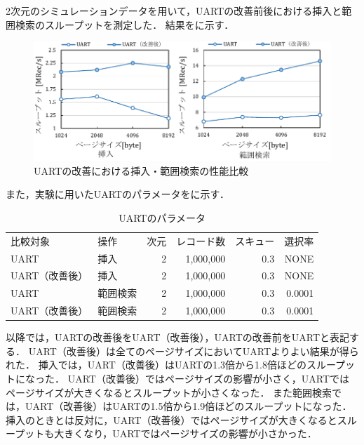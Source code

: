 2次元のシミュレーションデータを用いて，UARTの改善前後における挿入と範囲検索のスループットを測定した．
結果を\Fig{\ref{graph:pagesize}}に示す．
\begin{figure}[tb]
  \centering
  \includegraphics{./figures/graph-pagesize.pdf}
  \caption{UARTの改善における挿入・範囲検索の性能比較}
  \label{graph:pagesize}
\end{figure}
また，実験に用いたUARTのパラメータを\Tab{\ref{tab:pagesize}}に示す．
\begin{table}[tb]
  \caption{UARTのパラメータ}
  \label{tab:pagesize}
  \centering \small \small
  \begin{tabular}{llrrrr}
    \toprule
    比較対象       & 操作     & 次元 & レコード数 & スキュー & 選択率 \\
    \cmidrule(lr){1-1}
    \cmidrule(lr){2-2}
    \cmidrule(lr){3-3}
    \cmidrule(lr){4-4}
    \cmidrule(lr){5-5}
    \cmidrule(lr){6-6}
    UART           & 挿入     & 2    & 1,000,000  & 0.3      & NONE   \\
    UART（改善後） & 挿入     & 2    & 1,000,000  & 0.3      & NONE   \\
    UART           & 範囲検索 & 2    & 1,000,000  & 0.3      & 0.0001 \\
    UART（改善後） & 範囲検索 & 2    & 1,000,000  & 0.3      & 0.0001 \\
    \bottomrule
  \end{tabular}
\end{table}
以降では，UARTの改善後をUART（改善後），UARTの改善前をUARTと表記する．
UART（改善後）は全てのページサイズにおいてUARTよりよい結果が得られた．
挿入では，UART（改善後）はUARTの1.3倍から1.8倍ほどのスループットになった．
UART（改善後）ではページサイズの影響が小さく，UARTではページサイズが大きくなるとスループットが小さくなった．
また範囲検索では，UART（改善後）はUARTの1.5倍から1.9倍ほどのスループットになった．
挿入のときとは反対に，UART（改善後）ではページサイズが大きくなるとスループットも大きくなり，UARTではページサイズの影響が小さかった．

